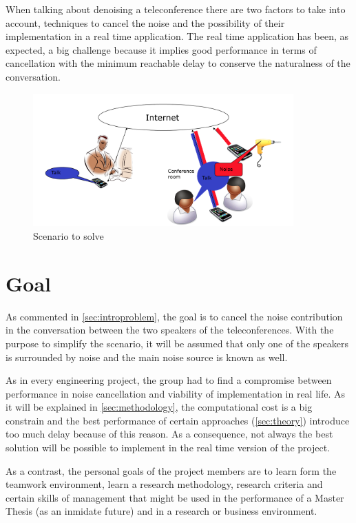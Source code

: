 \documentclass[11pt,a4paper,spanish]{book}  %
\theoremstyle{definition}  %
\theoremstyle{plain}  %
\theoremstyle{remark}  %
\begin{document}
	When talking about denoising a teleconference there are two factors to take into account, techniques to cancel the noise and the possibility of their implementation in a real time application. The real time application has been, as expected, a big challenge because it implies good performance in terms of cancellation with the minimum reachable delay to conserve the naturalness of the conversation.
	
		\begin{figure}[h]
		\centering
		\includegraphics[width=10cm]{images/other/scenario}
		\caption{Scenario to solve}
		\label{scenario2}
		\end{figure}
	
	
	
	\section{Goal}
	As commented in \ref{sec:introproblem}, the goal is to cancel the noise contribution in the conversation between the two speakers of the teleconferences. With the purpose to simplify the scenario, it will be assumed that only one of the speakers is surrounded by noise and the main noise source is known as well.
	
	As in every engineering project, the group had to find a compromise between performance in noise cancellation and viability of implementation in real life. As it will be explained in \ref{sec:methodology}, the computational cost is a big constrain and the best performance of certain approaches (\ref{sec:theory}) introduce too much delay because of this reason. As a consequence, not always the best solution will be possible to implement in the real time version of the project.
	
	As a contrast, the personal goals of the project members are to learn form the teamwork environment, learn a research methodology, research criteria and certain skills of management that might be used in the performance of a Master Thesis (as an inmidate future) and in a research or business environment.
	
\end{document}
